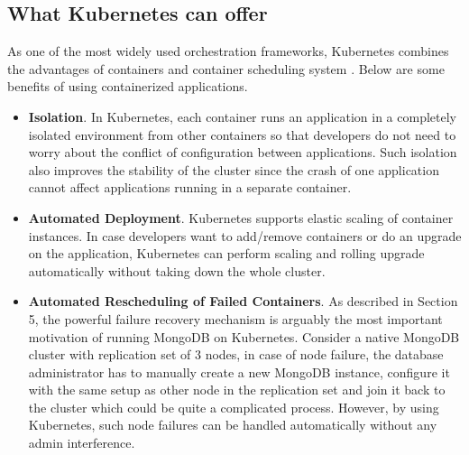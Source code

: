 \documentclass[sigconf]{acmart}
\begin{document}
\subsection{What Kubernetes can offer}
As one of the most widely used orchestration frameworks, Kubernetes combines the advantages of containers and container scheduling system \cite{mongoDBWhitePaper}. Below are some benefits of using containerized applications.
\begin{itemize}
    \item \textbf{Isolation}. In Kubernetes, each container runs an application in a completely isolated environment from other containers so that developers do not need to worry about the conflict of configuration between applications. Such isolation also improves the stability of the cluster since the crash of one application cannot affect applications running in a separate container.
    \item \textbf{Automated Deployment}. Kubernetes supports elastic scaling of container instances. In case developers want to add/remove containers or do an upgrade on the application, Kubernetes can perform scaling and rolling upgrade automatically without taking down the whole cluster.
    \item \textbf{Automated Rescheduling of Failed Containers}. As described in Section 5, the powerful failure recovery mechanism is arguably the most important motivation of running MongoDB on Kubernetes. Consider a native MongoDB cluster with replication set of 3 nodes, in case of node failure, the database administrator has to manually create a new MongoDB instance, configure it with the same setup as other node in the replication set and join it back to the cluster which could be quite a complicated process. However, by using Kubernetes, such node failures can be handled automatically without any admin interference.
\end{itemize}
\end{document}
